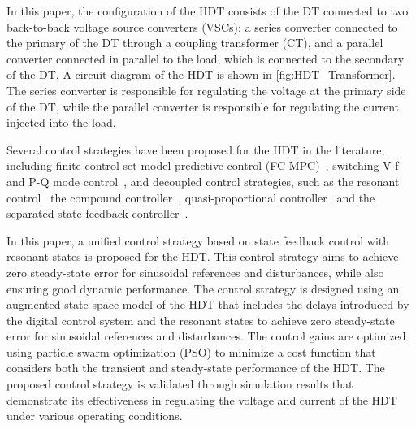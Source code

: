 In this paper, the configuration of the HDT consists of the DT connected to two back-to-back voltage source converters (VSCs): a series converter connected to the primary of the DT through a coupling transformer (CT), and a parallel converter connected in parallel to the load, which is connected to the secondary of the DT. A circuit diagram of the HDT is shown in \cref{fig:HDT_Transformer}. The series converter is responsible for regulating the voltage at the primary side of the DT, while the parallel converter is responsible for regulating the current injected into the load.

Several control strategies have been proposed for the HDT in the literature, including finite control set model predictive control (FC-MPC)~\cite{costaFourlegMatrixConverter2022}, switching V-f and P-Q mode control~\cite{xuThreePhaseHybridTransformer2023}, and decoupled control strategies, such as the resonant control~\cite{matelskiBadaniaEksperymentalneTransformatora2023} the compound controller~\cite{liuCompoundControlSystem2020}, quasi-proportional controller~\cite{liuQuasiProportionalResonantControlHybrid2022} and the separated state-feedback controller~\cite{carrenoStateFeedbackControlHybrid2024}.

In this paper, a unified control strategy based on state feedback control with resonant states is proposed for the HDT. This control strategy aims to achieve zero steady-state error for sinusoidal references and disturbances, while also ensuring good dynamic performance. The control strategy is designed using an augmented state-space model of the HDT that includes the delays introduced by the digital control system and the resonant states to achieve zero steady-state error for sinusoidal references and disturbances. The control gains are optimized using particle swarm optimization (PSO) to minimize a cost function that considers both the transient and steady-state performance of the HDT. The proposed control strategy is validated through simulation results that demonstrate its effectiveness in regulating the voltage and current of the HDT under various operating conditions.